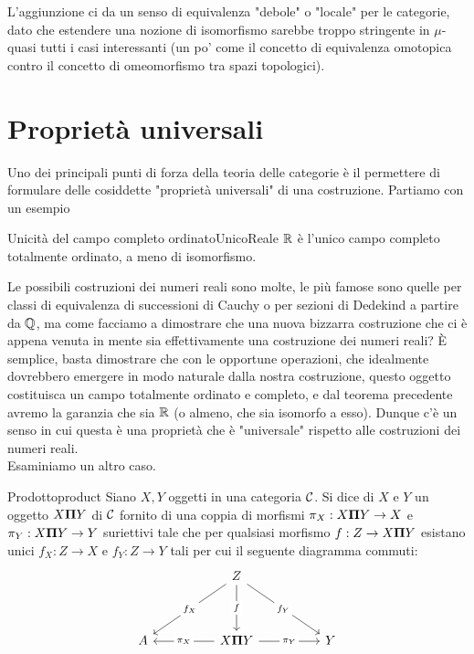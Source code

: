 \documentclass{article}
\begin{document}
L'aggiunzione ci da un senso di equivalenza "debole" o "locale" per le categorie, dato che estendere una nozione di isomorfismo sarebbe troppo stringente in $\mu$-quasi tutti i casi interessanti (un po' come il concetto di equivalenza omotopica contro il concetto di omeomorfismo tra spazi topologici).

\section{Proprietà universali}
\label{sec:Universal}

Uno dei principali punti di forza della teoria delle categorie è il permettere di formulare delle cosiddette "proprietà universali" di una costruzione. Partiamo con un esempio\cite{Huntington1903}

\begin{theorem}{Unicità del campo completo ordinato}{UnicoReale}
    $\mathbb{R}$ è l'unico campo completo totalmente ordinato, a meno di isomorfismo.
\end{theorem}

Le possibili costruzioni dei numeri reali sono molte, le più famose sono quelle per classi di equivalenza di successioni di Cauchy o per sezioni di Dedekind a partire da $\mathbb{Q}$, ma come facciamo a dimostrare che una nuova bizzarra costruzione che ci è appena venuta in mente sia effettivamente una costruzione dei numeri reali? È semplice, basta dimostrare che con le opportune operazioni, che idealmente dovrebbero emergere in modo naturale dalla nostra costruzione, questo oggetto costituisca un campo totalmente ordinato e completo, e dal teorema precedente avremo la garanzia che sia $\mathbb{R}$ (o almeno, che sia isomorfo a esso). Dunque c'è un senso in cui questa è una proprietà che è "universale" rispetto alle costruzioni dei numeri reali.\\ Esaminiamo un altro caso.

\begin{definition}{Prodotto}{product}
    Siano $X,Y$ oggetti in una categoria $\mathcal{C}$. Si dice  di $X$ e $Y$ un oggetto $X \mathbf{\Pi} Y$ di $\mathcal{C}$ fornito di una coppia di morfismi $\pi_X: X \mathbf{\Pi} Y \to X$ e $\pi_Y : X \mathbf{\Pi} Y \to Y$ suriettivi tale che per qualsiasi morfismo $f:Z\to X \mathbf{\Pi} Y$ esistano unici $f_X: Z \to X$ e $f_Y : Z\to Y$ tali per cui il seguente diagramma commuti: 
    \[\begin{tikzcd}
	    && Z \\
	    \\
	    A && {X \cattimes Y} && Y
	    \arrow["f"{description}, from=1-3, to=3-3]
	    \arrow["{\pi_X}"{description}, from=3-3, to=3-1]
	    \arrow["{f_X}"{description}, from=1-3, to=3-1]
	    \arrow["{f_Y}"{description}, from=1-3, to=3-5]
	    \arrow["{\pi_Y}"{description}, from=3-3, to=3-5]
    \end{tikzcd}\]
\end{definition}
\end{document}
